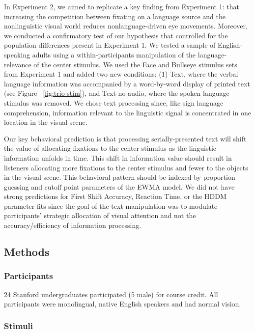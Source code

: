 \documentclass[english,floatsintext,man]{apa6}
\begin{document}
In Experiment 2, we aimed to replicate a key finding from Experiment 1:
that increasing the competition between fixating on a language source
and the nonlinguistic visual world reduces nonlanguage-driven eye
movements. Moreover, we conducted a confirmatory test of our hypothesis
that controlled for the population differences present in Experiment 1.
We tested a sample of English-speaking adults using a
within-participants manipulation of the language-relevance of the center
stimulus. We used the Face and Bullseye stimulus sets from Experiment 1
and added two new conditions: (1) Text, where the verbal language
information was accompanied by a word-by-word display of printed text
(see Figure ~\ref{fig:trio-stim}), and Text-no-audio, where the spoken
language stimulus was removed. We chose text processing since, like sign
language comprehension, information relevant to the linguistic signal is
concentrated in one location in the visual scene.

Our key behavioral prediction is that processing serially-presented text
will shift the value of allocating fixations to the center stimulus as
the linguistic information unfolds in time. This shift in information
value should result in listeners allocating more fixations to the center
stimulus and fewer to the objects in the visual scene. This behavioral
pattern should be indexed by proportion guessing and cutoff point
parameters of the EWMA model. We did not have strong predictions for
First Shift Accuracy, Reaction Time, or the HDDM parameter fits since
the goal of the text manipulation was to modulate participants'
strategic allocation of visual attention and not the accuracy/efficiency
of information processing.

\hypertarget{methods-1}{%
\subsection{Methods}\label{methods-1}}

\hypertarget{participants-1}{%
\subsubsection{Participants}\label{participants-1}}

24 Stanford undergraduates participated (5 male) for course credit. All
participants were monolingual, native English speakers and had normal
vision.

\hypertarget{stimuli-1}{%
\subsubsection{Stimuli}\label{stimuli-1}}
\end{document}
